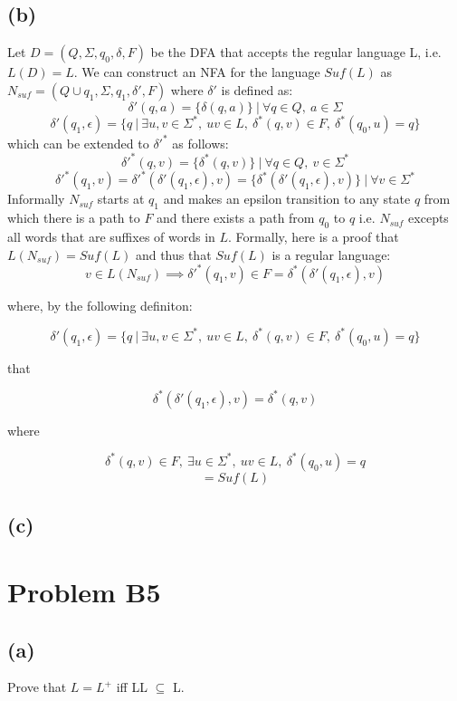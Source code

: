\documentclass[12pt]{article}
\begin{document}
\subsection*{(b)}
  Let $D = (Q, \Sigma, q_0, \delta, F)$ be the DFA that accepts the regular
  language L, i.e. $L(D) = L$. We can construct an NFA for the language
  $Suf(L)$ as $N_{suf} = (Q\cup{q_1}, \Sigma, q_1, \delta{'}, F)$
  where $\delta{'}$ is defined as:
  $$\delta{'}(q, a) = \{\delta(q,a)\} \:|\: \forall q \in Q ,\: a \in \Sigma$$
  $$\delta{'}(q_1, \epsilon) = \{q \:|\: \exists u,v \in \Sigma^* ,\:
  uv \in L ,\: \delta^* (q,v) \in F ,\: \delta^* (q_0,u) = q\}$$
  which can be extended to $\delta{'}^*$ as follows:
  $$\delta{'}^*(q, v) = \{\delta^*(q,v)\} \:|\:
  \forall q \in Q ,\: v \in \Sigma^*$$
  $$\delta{'}^*(q_1, v) = \delta{'}^*(\delta{'}(q_1, \epsilon), v) =
  \{\delta^*(\delta{'}(q_1, \epsilon), v)\} \:|\: \forall v \in \Sigma^*$$
  Informally $N_{suf}$ starts at $q_1$ and makes
  an epsilon transition to any state $q$ from which there is a path to $F$ and
  there exists a path from $q_0$ to $q$ i.e. $N_{suf}$ excepts all words that
  are suffixes of words in $L$. Formally, here is a proof that
  $L(N_{suf}) = Suf(L)$ and thus that $Suf(L)$ is a regular language:
  $$ v \in L(N_{suf}) \implies \delta{'}^*(q_1, v) \in F =
  \delta^*(\delta{'}(q_1, \epsilon), v)$$
  \begin{center}where, by the following definiton:\end{center}
  $$\delta{'}(q_1, \epsilon) = \{q \:|\: \exists u,v \in \Sigma^* ,\:
  uv \in L ,\: \delta^* (q,v) \in F ,\: \delta^* (q_0,u) = q\}$$
  \begin{center}that\end{center}
  $$\delta^*(\delta{'}(q_1, \epsilon), v) = \delta^*(q, v)$$
  \begin{center}where\end{center}
  $$\delta^* (q,v) \in F ,\: \exists u \in \Sigma^* ,\: uv \in L ,\:
  \delta^* (q_0,u) = q$$
  $$ = Suf(L)$$

\subsection*{(c)}

\section*{Problem B5}
\subsection*{(a)} Prove that $L=L^+$ iff LL $\subseteq$ L.
\end{document}
